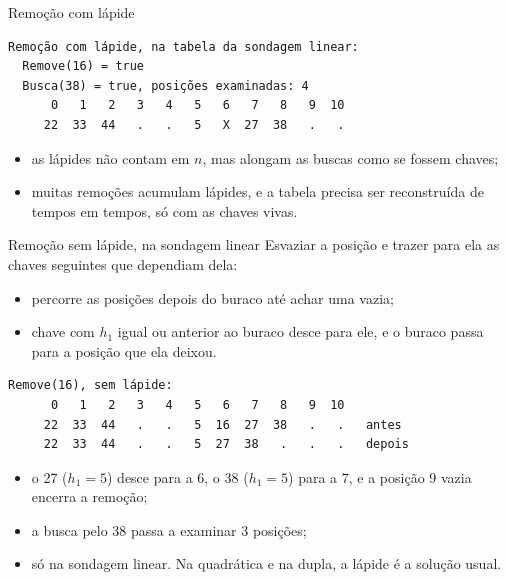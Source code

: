 \documentclass{beamer}
\begin{document}
\begin{frame}[fragile]{Remoção com lápide}
	\begin{verbatim}
Remoção com lápide, na tabela da sondagem linear:
  Remove(16) = true
  Busca(38) = true, posições examinadas: 4
      0   1   2   3   4   5   6   7   8   9  10
     22  33  44   .   .   5   X  27  38   .   .
\end{verbatim}

	\vspace{0.3cm}
	\begin{itemize}
		\item as lápides não contam em $n$, mas alongam as buscas como se fossem
		      chaves;
		\item muitas remoções acumulam lápides, e a tabela precisa ser reconstruída
		      de tempos em tempos, só com as chaves vivas.
	\end{itemize}
\end{frame}

\begin{frame}[fragile]{Remoção sem lápide, na sondagem linear}
	Esvaziar a posição e trazer para ela as chaves seguintes que dependiam dela:

	\vspace{0.2cm}
	\begin{itemize}
		\item percorre as posições depois do buraco até achar uma vazia;
		\item chave com $h_1$ igual ou anterior ao buraco desce para ele, e o buraco
		      passa para a posição que ela deixou.
	\end{itemize}

	\begin{verbatim}
Remove(16), sem lápide:
      0   1   2   3   4   5   6   7   8   9  10
     22  33  44   .   .   5  16  27  38   .   .   antes
     22  33  44   .   .   5  27  38   .   .   .   depois
\end{verbatim}

	\begin{itemize}
		\item o 27 ($h_1 = 5$) desce para a 6, o 38 ($h_1 = 5$) para a 7, e a
		      posição 9 vazia encerra a remoção;
		\item a busca pelo 38 passa a examinar 3 posições;
		\item só na sondagem linear. Na quadrática e na dupla, a lápide é a solução
		      usual.
	\end{itemize}
\end{frame}
\end{document}
